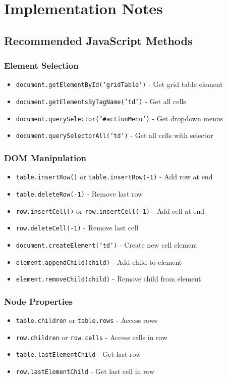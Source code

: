 \documentclass[11pt,a4paper]{article}
\begin{document}
\section{Implementation Notes}

\subsection{Recommended JavaScript Methods}

\subsubsection{Element Selection}
\begin{itemize}[leftmargin=*]
    \item \texttt{document.getElementById('gridTable')} - Get grid table element
    \item \texttt{document.getElementsByTagName('td')} - Get all cells
    \item \texttt{document.querySelector('\#actionMenu')} - Get dropdown menus
    \item \texttt{document.querySelectorAll('td')} - Get all cells with selector
\end{itemize}

\subsubsection{DOM Manipulation}
\begin{itemize}[leftmargin=*]
    \item \texttt{table.insertRow()} or \texttt{table.insertRow(-1)} - Add row at end
    \item \texttt{table.deleteRow(-1)} - Remove last row
    \item \texttt{row.insertCell()} or \texttt{row.insertCell(-1)} - Add cell at end
    \item \texttt{row.deleteCell(-1)} - Remove last cell
    \item \texttt{document.createElement('td')} - Create new cell element
    \item \texttt{element.appendChild(child)} - Add child to element
    \item \texttt{element.removeChild(child)} - Remove child from element
\end{itemize}

\subsubsection{Node Properties}
\begin{itemize}[leftmargin=*]
    \item \texttt{table.children} or \texttt{table.rows} - Access rows
    \item \texttt{row.children} or \texttt{row.cells} - Access cells in row
    \item \texttt{table.lastElementChild} - Get last row
    \item \texttt{row.lastElementChild} - Get last cell in row
\end{itemize}
\end{document}
